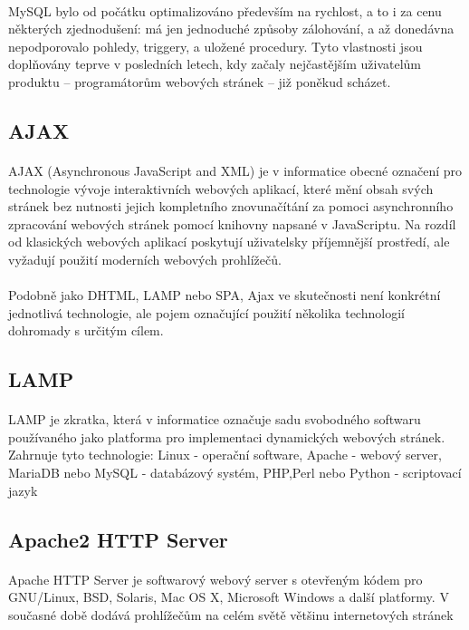 \paragraph{}
MySQL bylo od počátku optimalizováno především na rychlost, a to i za cenu některých zjednodušení: má jen jednoduché způsoby zálohování, a až donedávna nepodporovalo pohledy, triggery, a uložené procedury. Tyto vlastnosti jsou doplňovány teprve v posledních letech, kdy začaly nejčastějším uživatelům produktu – programátorům webových stránek – již poněkud scházet.

\subsection{AJAX}
\paragraph{}
AJAX (Asynchronous JavaScript and XML) je v informatice obecné označení pro technologie vývoje interaktivních webových aplikací, které mění obsah svých stránek bez nutnosti jejich kompletního znovunačítání za pomoci asynchronního zpracování webových stránek pomocí knihovny napsané v JavaScriptu. Na rozdíl od klasických webových aplikací poskytují uživatelsky příjemnější prostředí, ale vyžadují použití moderních webových prohlížečů.
\paragraph{}
Podobně jako DHTML, LAMP nebo SPA, Ajax ve skutečnosti není konkrétní jednotlivá technologie, ale pojem označující použití několika technologií dohromady s určitým cílem.
\subsection{LAMP}
\paragraph{}
LAMP je zkratka, která v informatice označuje sadu svobodného softwaru používaného jako platforma pro implementaci dynamických webových stránek. Zahrnuje tyto technologie: Linux - operační software, Apache - webový server,  MariaDB nebo MySQL - databázový systém, PHP,Perl nebo Python - scriptovací jazyk
\subsection{Apache2 HTTP Server}
\paragraph{}
Apache HTTP Server je softwarový webový server s otevřeným kódem pro GNU/Linux, BSD, Solaris, Mac OS X, Microsoft Windows a další platformy. V současné době dodává prohlížečům na celém světě většinu internetových stránek
